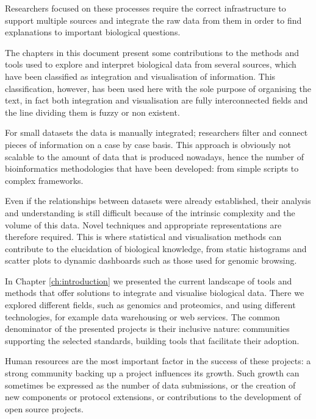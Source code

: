 Researchers focused on these processes require the correct infrastructure to support multiple sources and integrate the raw data from them in order to find explanations to important biological questions. 

The chapters in this document present some contributions to the methods and tools used to explore and interpret biological data from several sources, which have been classified as integration and visualisation of information. This classification, however, has been used here with the sole purpose of organising the text, in fact both integration and visualisation are fully interconnected fields and the line dividing them is fuzzy or non existent.

\vspace{5mm}

For small datasets the data is manually integrated; researchers  filter and connect pieces of information on a case by case basis. This approach is obviously not scalable to the amount of data that is produced nowadays, hence the number of bioinformatics methodologies that have been developed: from simple scripts to complex frameworks.

Even if the relationships between datasets were already established, their analysis and understanding is still difficult because of the intrinsic complexity and the volume of this data. Novel techniques and appropriate representations are therefore required. This is where statistical and visualisation methods can contribute to the elucidation of biological knowledge, from static histograms and scatter plots to dynamic dashboards such as those used for genomic browsing.

In Chapter \ref{ch:introduction} we presented the current landscape of tools and methods that offer solutions to integrate and visualise biological data. There we explored different fields, such as genomics and proteomics, and using different technologies, for example data warehousing or web services. The common denominator of the presented projects is their inclusive nature: communities supporting the selected standards, building tools that facilitate their adoption. 

Human resources are the most important factor in the success of these projects: a strong community backing up a project influences its growth. Such growth can sometimes be expressed as the number of data submissions, or the creation of new components or protocol extensions, or contributions to the development of open source projects.

